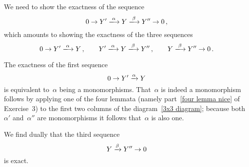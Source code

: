 We need to show the exactness of the sequence
\[
  0
  \to
  Y'
  \xlongto{\alpha}
  Y
  \xlongto{\beta}
  Y''
  \to
  0 \,,
\]
which amounts to showing the exactness of the three sequences
\[
  0 \to Y' \xlongto{\alpha} Y \,,
  \qquad
  Y' \xlongto{\alpha} Y \xlongto{\beta} Y'' \,,
  \qquad
  Y \xlongto{\beta} Y'' \to 0 \,.
\]

The exactness of the first sequence
\[
  0 \to Y' \xrightarrow{\alpha} Y
\]
is equivalent to~$\alpha$ being a monomorphisms.
That~$\alpha$ is indeed a monomorphism follows by applying one of the four lemmata (namely part~\ref{four lemma nice} of Exercise~3) to the first two columns of the diagram~\eqref{3x3 diagram};
because both~$\alpha'$ and~$\alpha''$ are monomorphisms it follows that~$\alpha$ is also one.

We find dually that the third sequence
\[
  Y \xrightarrow{\beta} Y'' \to 0
\]
is exact.

